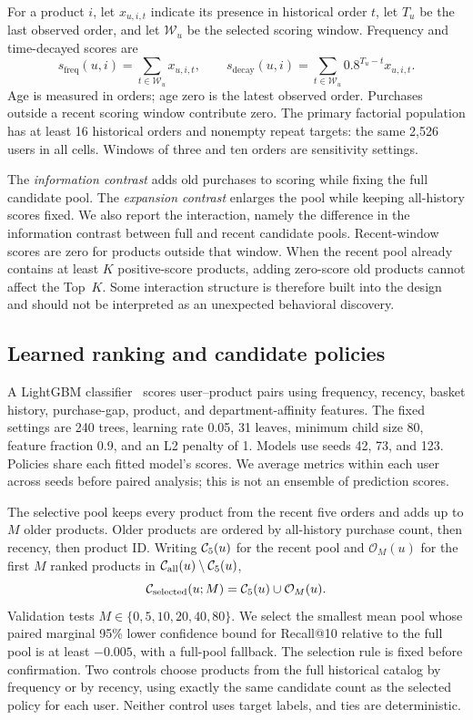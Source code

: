 For a product $i$, let $x_{u,i,t}$ indicate its presence in historical order $t$, let $T_u$ be the last observed order, and let $\mathcal{W}_u$ be the selected scoring window. Frequency and time-decayed scores are
\begin{equation}
 s_{\mathrm{freq}}(u,i)=\sum_{t\in\mathcal{W}_u}x_{u,i,t},\qquad
 s_{\mathrm{decay}}(u,i)=\sum_{t\in\mathcal{W}_u}0.8^{T_u-t}x_{u,i,t}.
 \label{eq:scores}
\end{equation}
Age is measured in orders; age zero is the latest observed order. Purchases outside a recent scoring window contribute zero. The primary factorial population has at least 16 historical orders and nonempty repeat targets: the same 2,526 users in all cells. Windows of three and ten orders are sensitivity settings.

The \emph{information contrast} adds old purchases to scoring while fixing the full candidate pool. The \emph{expansion contrast} enlarges the pool while keeping all-history scores fixed. We also report the interaction, namely the difference in the information contrast between full and recent candidate pools. Recent-window scores are zero for products outside that window. When the recent pool already contains at least $K$ positive-score products, adding zero-score old products cannot affect the Top~$K$. Some interaction structure is therefore built into the design and should not be interpreted as an unexpected behavioral discovery.

\subsection{Learned ranking and candidate policies}
A LightGBM classifier~\citep{ke2017} scores user--product pairs using frequency, recency, basket history, purchase-gap, product, and department-affinity features. The fixed settings are 240 trees, learning rate 0.05, 31 leaves, minimum child size 80, feature fraction 0.9, and an L2 penalty of 1. Models use seeds 42, 73, and 123. Policies share each fitted model's scores. We average metrics within each user across seeds before paired analysis; this is not an ensemble of prediction scores.

The selective pool keeps every product from the recent five orders and adds up to $M$ older products. Older products are ordered by all-history purchase count, then recency, then product ID. Writing $\mathcal{C}_5(u)$ for the recent pool and $\mathcal{O}_M(u)$ for the first $M$ ranked products in $\mathcal{C}_{\mathrm{all}}(u)\setminus\mathcal{C}_5(u)$,
\begin{equation}
 \mathcal{C}_{\mathrm{selected}}(u;M)=\mathcal{C}_5(u)\cup\mathcal{O}_M(u).
 \label{eq:policy}
\end{equation}
Validation tests $M\in\{0,5,10,20,40,80\}$. We select the smallest mean pool whose paired marginal 95\% lower confidence bound for Recall@10 relative to the full pool is at least $-0.005$, with a full-pool fallback. The selection rule is fixed before confirmation. Two controls choose products from the full historical catalog by frequency or by recency, using exactly the same candidate count as the selected policy for each user. Neither control uses target labels, and ties are deterministic.

